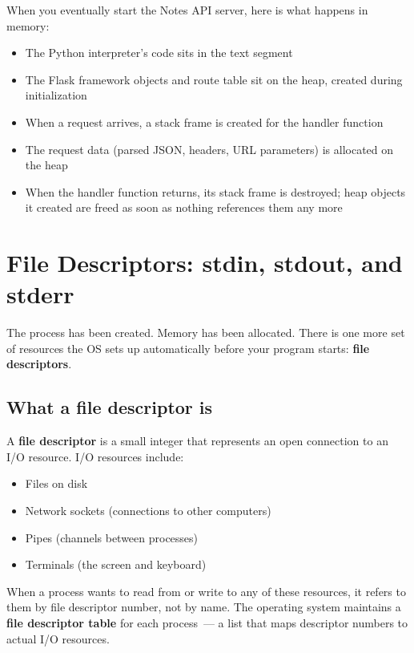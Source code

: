 When you eventually start the Notes API server, here is what happens in memory:

\begin{itemize}
\tightlist
\item
  The Python interpreter's code sits in the text segment
\item
  The Flask framework objects and route table sit on the heap, created during initialization
\item
  When a request arrives, a stack frame is created for the handler function
\item
  The request data (parsed JSON, headers, URL parameters) is allocated on the heap
\item
  When the handler function returns, its stack frame is destroyed; heap objects it created are freed as soon as nothing references them any more
\end{itemize}

\setcounter{section}{5}
\section{File Descriptors: stdin, stdout, and stderr}\label{01-command-to-process:16-file-descriptors-stdin-stdout-and-stderr}

The process has been created. Memory has been allocated. There is one more set of resources the OS sets up automatically before your program starts: \textbf{file descriptors}.

\subsection*{What a file descriptor is}\label{01-command-to-process:what-a-file-descriptor-is}

A \textbf{file descriptor} is a small integer that represents an open connection to an I/O resource. I/O resources include:

\begin{itemize}
\tightlist
\item
  Files on disk
\item
  Network sockets (connections to other computers)
\item
  Pipes (channels between processes)
\item
  Terminals (the screen and keyboard)
\end{itemize}

\noindent{}When a process wants to read from or write to any of these resources, it refers to them by file descriptor number, not by name. The operating system maintains a \textbf{file descriptor table} for each process~--- a list that maps descriptor numbers to actual I/O resources.

